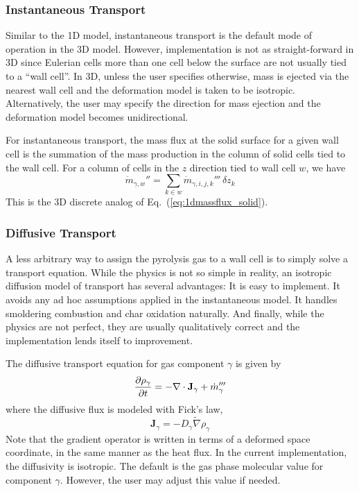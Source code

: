 {\subsubsection*{Instantaneous Transport}
\label{sec:instantaneous_transport}

Similar to the 1D model, instantaneous transport is the default mode of operation in the 3D model.  However, implementation is not as straight-forward in 3D since Eulerian cells more than one cell below the surface are not usually tied to a ``wall cell''.  In 3D, unless the user specifies otherwise, mass is ejected via the nearest wall cell and the deformation model is taken to be isotropic.  Alternatively, the user may specify the direction for mass ejection and the deformation model becomes unidirectional.

For instantaneous transport, the mass flux at the solid surface for a given wall cell is the summation of the mass production in the column of solid cells tied to the wall cell.  For a column of cells in the $z$ direction tied to wall cell $w$, we have
\begin{equation}
\label{eq:mdotint}
\dot{m}_{\gamma,w}'' = \sum_{k \in w} \dot{m}_{\gamma,i,j,k}''' \,\delta z_k
\end{equation}
This is the 3D discrete analog of Eq.~(\ref{eq:1dmassflux_solid}).

\subsubsection*{Diffusive Transport}
\label{sec:diffusive_transport}

A less arbitrary way to assign the pyrolysis gas to a wall cell is to simply solve a transport equation.  While the physics is not so simple in reality, an isotropic diffusion model of transport has several advantages:  It is easy to implement.  It avoids any ad hoc assumptions applied in the instantaneous model.  It handles smoldering combustion and char oxidation naturally.  And finally, while the physics are not perfect, they are usually qualitatively correct and the implementation lends itself to improvement.

The diffusive transport equation for gas component $\gamma$ is given by
\begin{equation}
\label{eq:diff}
\frac{\partial \rho_\gamma}{\partial t} = - \nabla\cdot\mathbf{J}_\gamma + \dot{m}_{\gamma}'''
\end{equation}
where the diffusive flux is modeled with Fick's law,
\begin{equation}
\label{eq:fick}
\mathbf{J}_\gamma = - D_{\gamma} \tilde{\nabla} \rho_\gamma
\end{equation}
Note that the gradient operator is written in terms of a deformed space coordinate, in the same manner as the heat flux.  In the current implementation, the diffusivity is isotropic.  The default is the gas phase molecular value for component $\gamma$.  However, the user may adjust this value if needed.

}
